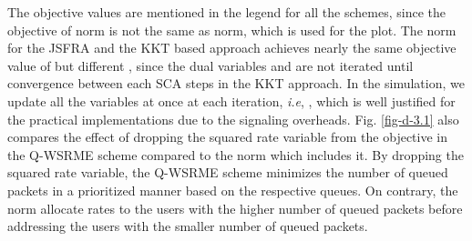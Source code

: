 The objective values are mentioned in the legend for all the schemes, since the objective of  norm is not the same as  norm, which is used for the plot. The  norm for the \ac{JSFRA} and the \ac{KKT} based approach achieves nearly the same objective value of  but different \me{\chi}, since the dual variables  and  are not iterated until convergence between each \ac{SCA} steps in the \ac{KKT} approach. In the simulation, we update all the variables at once at each iteration, \textit{i.e}, , which is well justified for the practical implementations due to the signaling overheads. Fig. \ref{fig-d-3.1} also compares the effect of dropping the squared rate variable from the objective in the \ac{Q-WSRME} scheme compared to the  norm which includes it. By dropping the squared rate variable, the \ac{Q-WSRME} scheme minimizes the number of queued packets in a prioritized manner based on the respective queues. On contrary, the  norm allocate rates to the users with the higher number of queued packets before addressing the users with the smaller number of queued packets.


